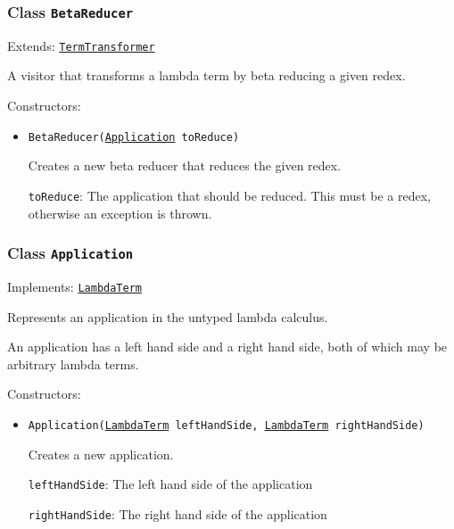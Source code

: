 \subsubsection{Class \texttt{BetaReducer}}
\label{type:edu.kit.wavelength.client.model.term.BetaReducer}
Extends: \texttt{\hyperref[type:edu.kit.wavelength.client.model.term.TermTransformer]{TermTransformer}}

A visitor that transforms a lambda term by beta reducing a given
 redex.

Constructors:
\begin{itemize}
\item \texttt{BetaReducer(\hyperref[type:edu.kit.wavelength.client.model.term.Application]{Application} toReduce)}

Creates a new beta reducer that reduces the given redex.

\texttt{toReduce}: The application that should be reduced.
 This must be a redex, otherwise an exception is thrown.

\end{itemize}

\subsubsection{Class \texttt{Application}}
\label{type:edu.kit.wavelength.client.model.term.Application}
Implements: \texttt{\hyperref[type:edu.kit.wavelength.client.model.term.LambdaTerm]{LambdaTerm}}

Represents an application in the untyped lambda calculus.
 
 An application has a left hand side and a right hand side,
 both of which may be arbitrary lambda terms.

Constructors:
\begin{itemize}
\item \texttt{Application(\hyperref[type:edu.kit.wavelength.client.model.term.LambdaTerm]{LambdaTerm} leftHandSide, \hyperref[type:edu.kit.wavelength.client.model.term.LambdaTerm]{LambdaTerm} rightHandSide)}

Creates a new application.

\texttt{leftHandSide}: The left hand side of the application

\texttt{rightHandSide}: The right hand side of the application

\end{itemize}

